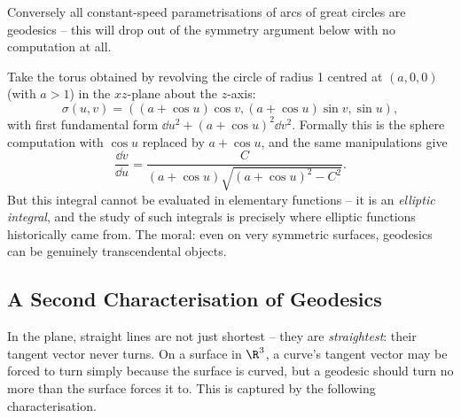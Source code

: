 \begin{example}
\begin{center}
    \end{center}
    Conversely all constant-speed parametrisations of arcs of great circles are geodesics -- this will drop out of the symmetry argument below with no computation at all.
\end{example}

\begin{example}
    Take the torus obtained by revolving the circle of radius 1 centred at $(a, 0, 0)$ (with $a > 1$) in the $xz$-plane about the $z$-axis:
    $$
    \sigma(u, v) = ((a + \cos u)\cos v, (a + \cos u)\sin v, \sin u),
    $$
    with first fundamental form $\dd u^2 + (a + \cos u)^2 \dd v^2$. Formally this is the sphere computation with $\cos u$ replaced by $a + \cos u$, and the same manipulations give
    $$
    \frac{\dd v}{\dd u} = \frac{C}{(a + \cos u)\sqrt{(a + \cos u)^2 - C^2}}.
    $$
    But this integral cannot be evaluated in elementary functions -- it is an \emph{elliptic integral}, and the study of such integrals is precisely where elliptic functions historically came from. The moral: even on very symmetric surfaces, geodesics can be genuinely transcendental objects.
\end{example}

\subsection{A Second Characterisation of Geodesics}

In the plane, straight lines are not just shortest -- they are \emph{straightest}: their tangent vector never turns. On a surface in $\R^3$, a curve's tangent vector may be forced to turn simply because the surface is curved, but a geodesic should turn no more than the surface forces it to. This is captured by the following characterisation.


